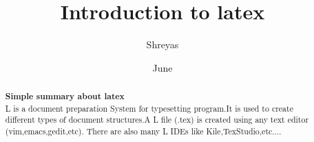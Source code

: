 \documentclass[a3 paper,12pt]{article}
\title{Introduction to latex}
\author{Shreyas}
\date{\11 June}
\begin{document}
\begin{abstract}

    \textbf{Simple summary about latex}\\
    
L is a document preparation System for typesetting program.It is used to create different types of document structures.A L file (.tex) is created using any text editor (vim,emacs,gedit,etc). There are also many L IDEs like Kile,TexStudio,etc....   

\end{abstract}
\end{document}
